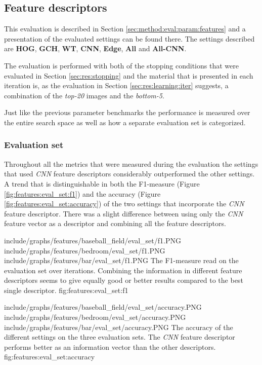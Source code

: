 
\subsection{Feature descriptors}
\label{sec:res:features}
This evaluation is described in Section \ref{sec:method:eval:param:features} and a presentation of the evaluated settings can be found there. The settings described are \textbf{HOG}, \textbf{GCH}, \textbf{WT}, \textbf{CNN}, \textbf{Edge}, \textbf{All} and \textbf{All-CNN}.

The evaluation is performed with both of the stopping conditions that were evaluated in Section \ref{sec:res:stopping} and the material that is presented in each iteration is, as the evaluation in Section \ref{sec:res:learning:iter} suggests, a combination of the \emph{top-20} images and the \emph{bottom-5}. 

Just like the previous parameter benchmarks the performance is measured over the entire search space as well as how a separate evaluation set is categorized.

\subsubsection{Evaluation set}
\label{sec:res:features:eval}


Throughout all the metrics that were measured during the evaluation the settings that used \emph{CNN} feature descriptors considerably outperformed the other settings.  A trend that is distinguishable in both the F1-measure (Figure \ref{fig:features:eval_set:f1}) and the accuracy (Figure \ref{fig:features:eval_set:accuracy}) of the two settings that incorporate the \emph{CNN} feature descriptor. There was a slight difference between using only the \emph{CNN} feature vector as a descriptor and combining all the feature descriptors.

\tripfigurenear
{include/graphs/features/baseball_field/eval_set/f1.PNG}
{include/graphs/features/bedroom/eval_set/f1.PNG}
{include/graphs/features/bar/eval_set/f1.PNG}
{The F1-measure read on the evaluation set over iterations. Combining the information in different feature descriptors seems to give equally good or better results compared to the best single descriptor.}
{fig:features:eval_set:f1}

\tripfigurenear
{include/graphs/features/baseball_field/eval_set/accuracy.PNG}
{include/graphs/features/bedroom/eval_set/accuracy.PNG}
{include/graphs/features/bar/eval_set/accuracy.PNG}
{The accuracy of the different settings on the three evaluation sets. The \emph{CNN} feature descriptor performs better as an information vector than the other descriptors.}
{fig:features:eval_set:accuracy}


